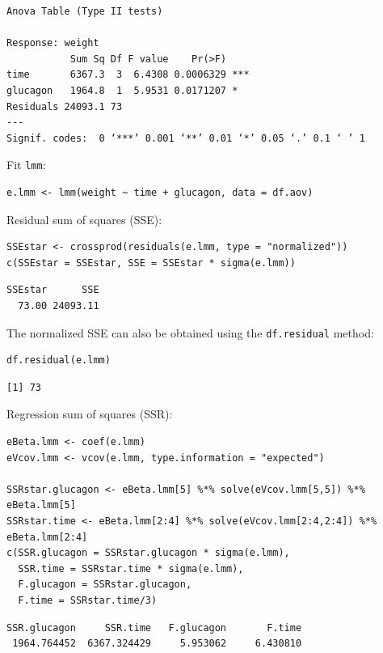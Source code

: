 \documentclass[12pt]{article}
\begin{document}
\begin{verbatim}
Anova Table (Type II tests)

Response: weight
           Sum Sq Df F value    Pr(>F)    
time       6367.3  3  6.4308 0.0006329 ***
glucagon   1964.8  1  5.9531 0.0171207 *  
Residuals 24093.1 73                      
---
Signif. codes:  0 ‘***’ 0.001 ‘**’ 0.01 ‘*’ 0.05 ‘.’ 0.1 ‘ ’ 1
\end{verbatim}


Fit \texttt{lmm}:
\lstset{language=r,label= ,caption= ,captionpos=b,numbers=none}
\begin{lstlisting}
e.lmm <- lmm(weight ~ time + glucagon, data = df.aov)
\end{lstlisting}

Residual sum of squares (SSE):
\lstset{language=r,label= ,caption= ,captionpos=b,numbers=none}
\begin{lstlisting}
SSEstar <- crossprod(residuals(e.lmm, type = "normalized"))
c(SSEstar = SSEstar, SSE = SSEstar * sigma(e.lmm))
\end{lstlisting}

\begin{verbatim}
SSEstar      SSE 
  73.00 24093.11
\end{verbatim}


The normalized SSE can also be obtained using the \texttt{df.residual} method:
\lstset{language=r,label= ,caption= ,captionpos=b,numbers=none}
\begin{lstlisting}
df.residual(e.lmm)
\end{lstlisting}

\begin{verbatim}
[1] 73
\end{verbatim}


Regression sum of squares (SSR):
\lstset{language=r,label= ,caption= ,captionpos=b,numbers=none}
\begin{lstlisting}
eBeta.lmm <- coef(e.lmm)
eVcov.lmm <- vcov(e.lmm, type.information = "expected")

SSRstar.glucagon <- eBeta.lmm[5] %*% solve(eVcov.lmm[5,5]) %*% eBeta.lmm[5] 
SSRstar.time <- eBeta.lmm[2:4] %*% solve(eVcov.lmm[2:4,2:4]) %*% eBeta.lmm[2:4] 
c(SSR.glucagon = SSRstar.glucagon * sigma(e.lmm),
  SSR.time = SSRstar.time * sigma(e.lmm),
  F.glucagon = SSRstar.glucagon,
  F.time = SSRstar.time/3)
\end{lstlisting}

\begin{verbatim}
SSR.glucagon     SSR.time   F.glucagon       F.time 
 1964.764452  6367.324429     5.953062     6.430810
\end{verbatim}
\end{document}
